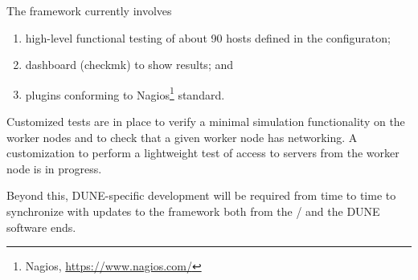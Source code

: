 \documentclass[../main-v1.tex]{subfiles}
\begin{document}
The  framework currently involves 
\begin{enumerate}
\item high-level functional testing of about 90 hosts defined in the  configuraton;
\item dashboard (checkmk) to show results; and
\item plugins conforming to Nagios\footnote{Nagios\textregistered, \url{https://www.nagios.com/}} standard. 
\end{enumerate}


\begin{comment} see below (anne)
Some customization of the tests has been done, and  further changes being planned, which are :
\begin{enumerate}
    \item Minimal simulation to test that a simulation works on the worker nodes (Done)
    \item Checking if a given worker node has ipv6 networking (Done)
    \item Lightweight test of access to rucio servers from the worker node (ongoing)
\end{enumerate}
\end{comment}

Customized tests are in place to verify %
a minimal simulation functionality on the worker nodes and to check that a given worker node has  networking. A customization to perform a lightweight test of access to   servers from the worker node is in progress.

Beyond this, DUNE-specific development will be required from time to time %
to synchronize with updates to the framework both from the  /  and the DUNE software ends. %

\end{document}
